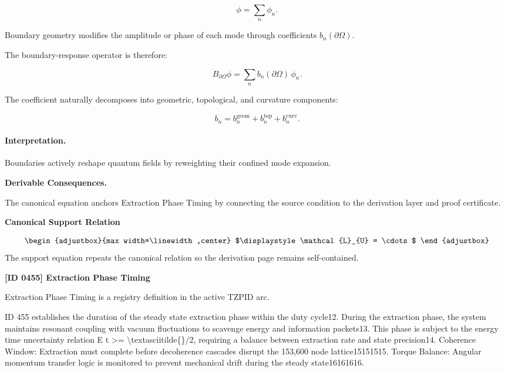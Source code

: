 \begin{equation}
\phi=\sum_n \phi_n .
\end{equation}

Boundary geometry modifies the amplitude or phase of each mode through coefficients $b_n(\partial\Omega)$.

The boundary-response operator is therefore:

\begin{equation}
\boxed{
B_{\partial\Omega}\phi
=
\sum_n b_n(\partial\Omega)\,\phi_n .
}
\end{equation}

The coefficient naturally decomposes into geometric, topological, and curvature components:

\begin{equation}
b_n
=
b_n^{\mathrm{geom}}
+
b_n^{\mathrm{top}}
+
b_n^{\mathrm{curv}} .
\end{equation}

\paragraph{Interpretation.}
Boundaries actively reshape quantum fields by reweighting their confined mode expansion.

\par\vspace{0.35em}
\noindent\textbf{Derivable Consequences.}\quad
\begingroup
\footnotesize
\raggedright
The canonical equation anchors Extraction Phase Timing by connecting the source condition to the derivation layer and proof certificate.
\par\endgroup

\noindent\textbf{Canonical Support Relation}\par
\[
\begin{adjustbox}{max width=\linewidth,center}
$\displaystyle
\mathcal{L}_{U} = \cdots
$
\end{adjustbox}
\]
\noindent The support equation repeats the canonical relation so the derivation page remains self-contained.\par

\clearpage
\noindent\textbf{[ID 0455] Extraction Phase Timing}\par
\vspace{0.35em}
\begingroup\small
{}
Extraction Phase Timing is a registry definition in the active TZPID arc.

ID 455 establishes the duration of the steady state extraction phase within the duty cycle12. During the extraction phase, the system maintains resonant coupling with vacuum fluctuations to scavenge energy and information packets13. This phase is subject to the energy time uncertainty relation E t >= \textbackslash{}textasciitilde\{\}/2, requiring a balance between extraction rate and state precision14. Coherence Window: Extraction must complete before decoherence cascades disrupt the 153,600 node lattice15151515. Torque Balance: Angular momentum transfer logic is monitored to prevent mechanical drift during the steady state16161616.

